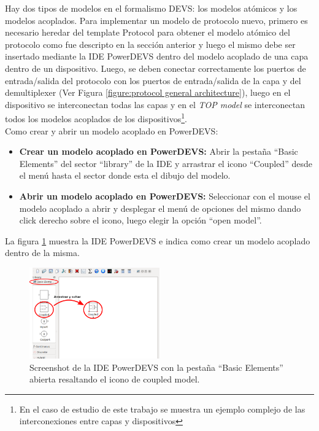 \documentclass[10pt,a4paper]{article}
\begin{document}
Hay dos tipos de modelos en el formalismo DEVS: los modelos atómicos y los modelos acoplados. Para implementar un modelo de protocolo nuevo, primero es necesario heredar del template Protocol para obtener el modelo atómico del protocolo como fue descripto en la sección anterior y luego el mismo debe ser insertado mediante la IDE PowerDEVS dentro del modelo acoplado de una capa dentro de un dispositivo. Luego, se deben conectar correctamente los puertos de entrada/salida del protocolo con los puertos de entrada/salida de la capa y del demultiplexer (Ver Figura \ref{figure:protocol general architecture}), luego en el dispositivo se interconectan todas las capas y en el \textit{TOP model} se interconectan todos los modelos acoplados de los dispositivos\footnote{En el caso de estudio de este trabajo se muestra un ejemplo complejo de las interconexiones entre capas y dispositivos}. \\

Como crear y abrir un modelo acoplado en PowerDEVS:
\begin{itemize}
\item \textbf{Crear un modelo acoplado en PowerDEVS: } Abrir la pestaña ``Basic Elements'' del sector ``library'' de la IDE y arrastrar el icono ``Coupled'' desde el menú hasta el sector donde esta el dibujo del modelo.
\item \textbf{Abrir un modelo acoplado en PowerDEVS:} Seleccionar con el mouse el modelo acoplado a abrir y desplegar el menú de opciones del mismo dando click derecho sobre el icono, luego elegir la opción ``open model''.
\end{itemize}

La figura \ref{figure: PowerDEVS IDE} muestra la IDE PowerDEVS e indica como crear un modelo acoplado dentro de la misma. \\

\begin{figure}[htb]
    \centering
    \includegraphics[width = 0.5\textwidth]{img/png/powerDEVS_coupled.png}
    \caption{Screenshot de la IDE PowerDEVS con la pestaña ``Basic Elements'' abierta resaltando el icono de coupled model.}
    \label{figure: PowerDEVS IDE}
\end{figure}
\end{document}
